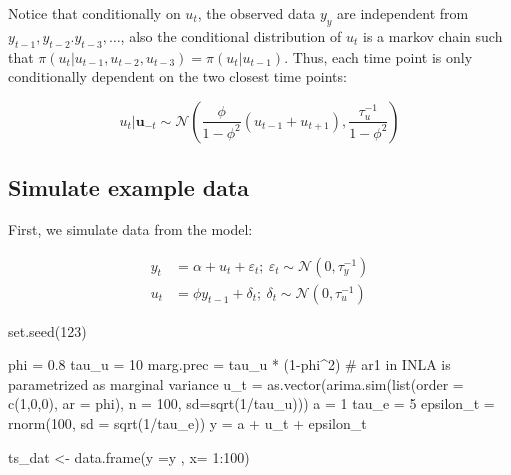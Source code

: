 \documentclass[
  letterpaper,
  DIV=11,
  numbers=noendperiod]{scrartcl}
\newenvironment{Shaded}{\begin{snugshade}}{\end{snugshade}}
\newcommand{\AttributeTok}[1]{\textcolor[rgb]{0.40,0.45,0.13}{#1}}
\newcommand{\CommentTok}[1]{\textcolor[rgb]{0.37,0.37,0.37}{#1}}
\newcommand{\DecValTok}[1]{\textcolor[rgb]{0.68,0.00,0.00}{#1}}
\newcommand{\FloatTok}[1]{\textcolor[rgb]{0.68,0.00,0.00}{#1}}
\newcommand{\FunctionTok}[1]{\textcolor[rgb]{0.28,0.35,0.67}{#1}}
\newcommand{\NormalTok}[1]{\textcolor[rgb]{0.00,0.23,0.31}{#1}}
\newcommand{\OtherTok}[1]{\textcolor[rgb]{0.00,0.23,0.31}{#1}}
\newcommand{\SpecialCharTok}[1]{\textcolor[rgb]{0.37,0.37,0.37}{#1}}
\begin{document}
Notice that conditionally on \(u_t\), the observed data \(y_y\) are
independent from\(y_{t-1},y_{t-2}.y_{t-3},\ldots\), also the conditional
distribution of \(u_t\) is a markov chain such that
\(\pi(u_t|u_{t-1},u_{t-2},u_{t-3}) = \pi(u_t|u_{t-1})\). Thus, each time
point is only conditionally dependent on the two closest time points:

\[
u_t|\mathbf{u}_{-t} \sim \mathcal{N}\left(\frac{\phi}{1-\phi^2}(u_{t-1}+u_{t+1}),\frac{\tau_u^{-1}}{1-\phi^2}\right)
\]

\subsection{Simulate example data}\label{simulate-example-data}

First, we simulate data from the model:

\[
\begin{aligned}
y_t &= \alpha + u_t + \varepsilon_t;~ \varepsilon_t \sim \mathcal{N}(0,\tau_y^{-1})\\
u_t &= \phi y_{t-1} + \delta_t; ~ \delta_t \sim \mathcal{N}(0,\tau_u^{-1})
\end{aligned}
\]

\begin{Shaded}
\begin{Highlighting}[]
\FunctionTok{set.seed}\NormalTok{(}\DecValTok{123}\NormalTok{)}

\NormalTok{phi }\OtherTok{=} \FloatTok{0.8}
\NormalTok{tau\_u }\OtherTok{=} \DecValTok{10}
\NormalTok{marg.prec }\OtherTok{=}\NormalTok{ tau\_u }\SpecialCharTok{*}\NormalTok{ (}\DecValTok{1}\SpecialCharTok{{-}}\NormalTok{phi}\SpecialCharTok{\^{}}\DecValTok{2}\NormalTok{) }\CommentTok{\# ar1 in INLA is parametrized as marginal variance}
\NormalTok{u\_t }\OtherTok{=}  \FunctionTok{as.vector}\NormalTok{(}\FunctionTok{arima.sim}\NormalTok{(}\FunctionTok{list}\NormalTok{(}\AttributeTok{order =} \FunctionTok{c}\NormalTok{(}\DecValTok{1}\NormalTok{,}\DecValTok{0}\NormalTok{,}\DecValTok{0}\NormalTok{), }\AttributeTok{ar =}\NormalTok{ phi), }
                          \AttributeTok{n =} \DecValTok{100}\NormalTok{,}
                          \AttributeTok{sd=}\FunctionTok{sqrt}\NormalTok{(}\DecValTok{1}\SpecialCharTok{/}\NormalTok{tau\_u)))}
\NormalTok{a }\OtherTok{=} \DecValTok{1}
\NormalTok{tau\_e }\OtherTok{=} \DecValTok{5}
\NormalTok{epsilon\_t }\OtherTok{=} \FunctionTok{rnorm}\NormalTok{(}\DecValTok{100}\NormalTok{, }\AttributeTok{sd =} \FunctionTok{sqrt}\NormalTok{(}\DecValTok{1}\SpecialCharTok{/}\NormalTok{tau\_e))}
\NormalTok{y }\OtherTok{=}\NormalTok{ a }\SpecialCharTok{+}\NormalTok{ u\_t }\SpecialCharTok{+}\NormalTok{ epsilon\_t}


\NormalTok{ts\_dat }\OtherTok{\textless{}{-}} \FunctionTok{data.frame}\NormalTok{(}\AttributeTok{y =}\NormalTok{y , }\AttributeTok{x=} \DecValTok{1}\SpecialCharTok{:}\DecValTok{100}\NormalTok{)}
\end{Highlighting}
\end{Shaded}
\end{document}
